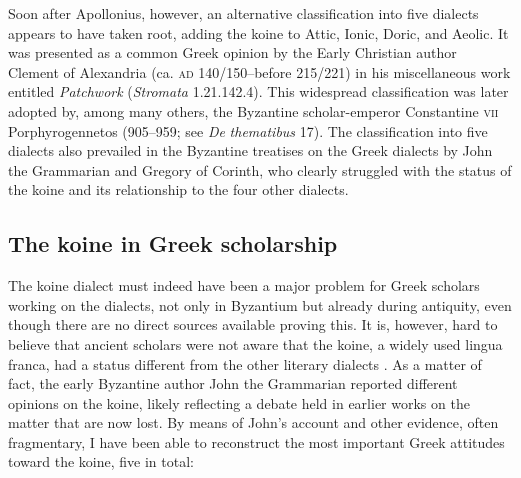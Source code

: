 Soon after Apollonius, however, an alternative classification into five dialects appears to have taken root, adding the koine to Attic, Ionic, Doric, and Aeolic. It was presented as a common Greek opinion by the Early Christian author Clement of Alexandria (ca. \textsc{ad} 140/150–before 215/221) in his miscellaneous work entitled \textit{Patchwork} (\textit{Stromata} 1.21.142.4). This widespread classification was later adopted by, among many others, the Byzantine scholar-emperor Constantine \textsc{vii} Porphyrogennetos (905–959; see \textit{De} \textit{thematibus} 17). The classification into five dialects also prevailed in the Byzantine treatises on the Greek dialects by John the Grammarian and Gregory of Corinth, who clearly struggled with the status of the koine and its relationship to the four other dialects.

\subsection{The koine in Greek scholarship}
\hypertarget{Toc19704809}{}
The koine dialect must indeed have been a major problem for Greek scholars working on the dialects, not only in Byzantium but already during antiquity, even though there are no direct sources available proving this. It is, however, hard to believe that ancient scholars were not aware that the koine, a widely used lingua franca, had a status different from the other literary dialects \citep{Consani2000}. As a matter of fact, the early Byzantine author John the Grammarian reported different opinions on the koine, likely reflecting a debate held in earlier works on the matter that are now lost. By means of John’s account and other evidence, often fragmentary, I have been able to reconstruct the most important Greek attitudes toward the koine, five in total:

